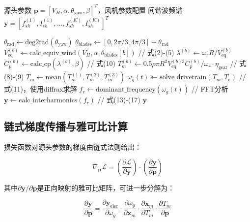 \documentclass[withoutpreface,bwprint]{cumcmthesis}
\begin{document}
\begin{algorithm}[!ht]
\caption{全链路正向模型的JAX实现}
\label{alg:forward}
\begin{algorithmic}[1]
\REQUIRE 源头参数 $\mathbf{p} = [V_H, \alpha, \theta_{\mathrm{yaw}}, \beta]^T$，风机参数配置
\ENSURE 间谐波频谱 $\mathbf{y} = [f_{sh}^{(1)}, I_{sh}^{(1)}, \ldots, f_{sh}^{(K)}, I_{sh}^{(K)}]^T$

\STATE $\theta_{\mathrm{rad}} \gets \text{deg2rad}(\theta_{\mathrm{yaw}})$
\STATE $\theta_{\mathrm{blades}} \gets [0, 2\pi/3, 4\pi/3] + \theta_{\mathrm{rad}}$
    \STATE $V_{\mathrm{eq}}^{(b)} \gets \text{calc\_equiv\_wind}(V_H, \alpha, \theta_{\mathrm{blades}}[b])$  \quad // 式(2)-(5)
    \STATE $\lambda^{(b)} \gets \omega_r R / V_{\mathrm{eq}}^{(b)}$
    \STATE $C_p^{(b)} \gets \text{calc\_cp}(\lambda^{(b)}, \beta)$ \quad // 式(10)
    \STATE $T_m^{(b)} \gets 0.5\rho\pi R^2 V_{\mathrm{eq}}^{(b)3} C_p^{(b)} / \omega_r \cdot \eta_{\mathrm{gear}}$  \quad // 式(8)-(9)
\ENDFOR
\STATE $T_m \gets \text{mean}(T_m^{(1)}, T_m^{(2)}, T_m^{(3)})$
\STATE $\omega_g(t) \gets \text{solve\_drivetrain}(T_m, T_e)$ \quad // 式(11)，使用diffrax求解
\STATE $f_r \gets \text{dominant\_frequency}(\omega_g(t))$ \quad // FFT分析
\STATE $\mathbf{y} \gets \text{calc\_interharmonics}(f_r)$ \quad // 式(13)-(17)
\RETURN $\mathbf{y}$
\end{algorithmic}
\end{algorithm}

\subsection{链式梯度传播与雅可比计算}

损失函数对源头参数的梯度由链式法则给出：

\begin{equation}
\nabla_{\mathbf{p}}\mathcal{L} = \left(\frac{\partial\mathcal{L}}{\partial\mathbf{y}}\right)\cdot\left(\frac{\partial\mathbf{y}}{\partial\mathbf{p}}\right)
\label{eq:grad_chain}
\end{equation}

其中$\partial\mathbf{y}/\partial\mathbf{p}$是正向映射的雅可比矩阵，可进一步分解为：

\begin{equation}
\frac{\partial\mathbf{y}}{\partial\mathbf{p}} = 
\frac{\partial\mathbf{y}_{\mathrm{elec}}}{\partial\omega_g}\cdot
\frac{\partial\omega_g}{\partial\mathbf{x}_m}\cdot
\frac{\partial\mathbf{x}_m}{\partial T_m}\cdot
\frac{\partial T_m}{\partial\mathbf{p}}
\label{eq:jacobian_decomp}
\end{equation}
\end{document}
